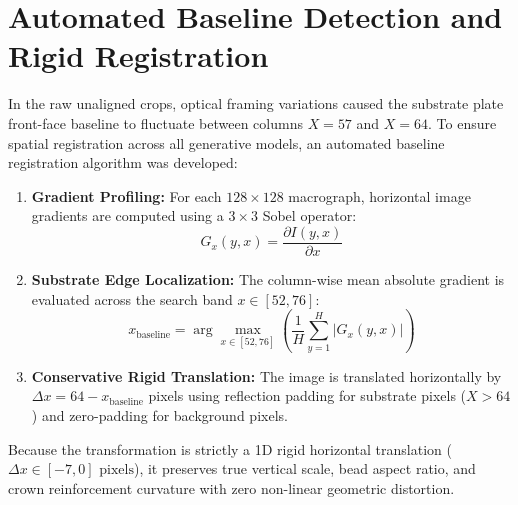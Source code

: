 \documentclass[12pt,a4paper,oneside]{report}
\begin{document}
\section{Automated Baseline Detection and Rigid Registration}
In the raw unaligned crops, optical framing variations caused the substrate plate front-face baseline to fluctuate between columns $X=57$ and $X=64$. To ensure spatial registration across all generative models, an automated baseline registration algorithm was developed:
\begin{enumerate}
    \item \textbf{Gradient Profiling:} For each $128 \times 128$ macrograph, horizontal image gradients are computed using a $3 \times 3$ Sobel operator:
    \begin{equation}
        G_x(y, x) = \frac{\partial I(y, x)}{\partial x}
    \end{equation}
    \item \textbf{Substrate Edge Localization:} The column-wise mean absolute gradient is evaluated across the search band $x \in [52, 76]$:
    \begin{equation}
        x_{\text{baseline}} = \arg\max_{x \in [52, 76]} \left( \frac{1}{H} \sum_{y=1}^{H} |G_x(y, x)| \right)
    \end{equation}
    \item \textbf{Conservative Rigid Translation:} The image is translated horizontally by $\Delta x = 64 - x_{\text{baseline}}$ pixels using reflection padding for substrate pixels ($X > 64$) and zero-padding for background pixels.
\end{enumerate}
Because the transformation is strictly a 1D rigid horizontal translation ($\Delta x \in [-7, 0]\text{ pixels}$), it preserves true vertical scale, bead aspect ratio, and crown reinforcement curvature with zero non-linear geometric distortion.
\end{document}
